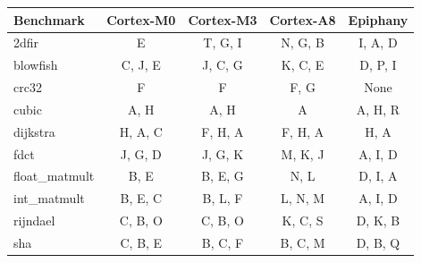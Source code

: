 \documentclass[twocolumn]{article}
\begin{document}
\begin{table}
	\centering
	\begin{tabular}{l >{\ttfamily} c >{\ttfamily} c >{\ttfamily} c >{\ttfamily} c }
		\bfseries Benchmark&\rmfamily\bfseries Cortex-M0&\rmfamily\bfseries Cortex-M3 & \rmfamily\bfseries Cortex-A8		& \rmfamily\bfseries Epiphany\\
		\hline
		2dfir          &  E        &  T, G, I  &  N, G, B  &  I, A, D  \\
		blowfish       &  C, J, E  &  J, C, G  &  K, C, E  &  D, P, I  \\
		crc32          &  F        &  F        &  F, G     &  None     \\
		cubic          &  A, H     &  A, H     &  A        &  A, H, R  \\
		dijkstra       &  H, A, C  &  F, H, A  &  F, H, A  &  H, A     \\
		fdct           &  J, G, D  &  J, G, K  &  M, K, J  &  A, I, D  \\
		float\_matmult &  B, E     &  B, E, G  &  N, L     &  D, I, A  \\
		int\_matmult   &  B, E, C  &  B, L, F  &  L, N, M  &  A, I, D  \\
		rijndael       &  C, B, O  &  C, B, O  &  K, C, S  &  D, K, B  \\
		sha            &  C, B, E  &  B, C, F  &  B, C, M  &  D, B, Q  \\

	\end{tabular} \\[1em]


\end{table}
\end{document}
